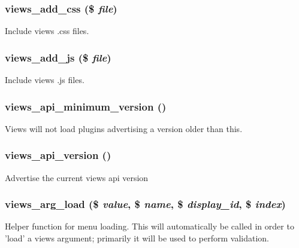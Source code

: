\hypertarget{views_8module_ae236596838c24ca0d9639b523e397cd4}{
\subsubsection[{views\_\-add\_\-css}]{\setlength{\rightskip}{0pt plus 5cm}views\_\-add\_\-css (\$ {\em file})}}
\label{views_8module_ae236596838c24ca0d9639b523e397cd4}
Include views .css files. \hypertarget{views_8module_a46f0b0606a74393adc87edd14044edbe}{
\subsubsection[{views\_\-add\_\-js}]{\setlength{\rightskip}{0pt plus 5cm}views\_\-add\_\-js (\$ {\em file})}}
\label{views_8module_a46f0b0606a74393adc87edd14044edbe}
Include views .js files. \hypertarget{views_8module_a218d917d0079bfe634c320d51e0ab403}{
\subsubsection[{views\_\-api\_\-minimum\_\-version}]{\setlength{\rightskip}{0pt plus 5cm}views\_\-api\_\-minimum\_\-version ()}}
\label{views_8module_a218d917d0079bfe634c320d51e0ab403}
Views will not load plugins advertising a version older than this. \hypertarget{views_8module_a771e26f3407f1baf8ffbaa97e7b91579}{
\subsubsection[{views\_\-api\_\-version}]{\setlength{\rightskip}{0pt plus 5cm}views\_\-api\_\-version ()}}
\label{views_8module_a771e26f3407f1baf8ffbaa97e7b91579}
Advertise the current views api version \hypertarget{views_8module_a606f90f31faa85d799a5ff1dc82cc8f1}{
\subsubsection[{views\_\-arg\_\-load}]{\setlength{\rightskip}{0pt plus 5cm}views\_\-arg\_\-load (\$ {\em value}, \/  \$ {\em name}, \/  \$ {\em display\_\-id}, \/  \$ {\em index})}}
\label{views_8module_a606f90f31faa85d799a5ff1dc82cc8f1}
Helper function for menu loading. This will automatically be called in order to 'load' a views argument; primarily it will be used to perform validation.


